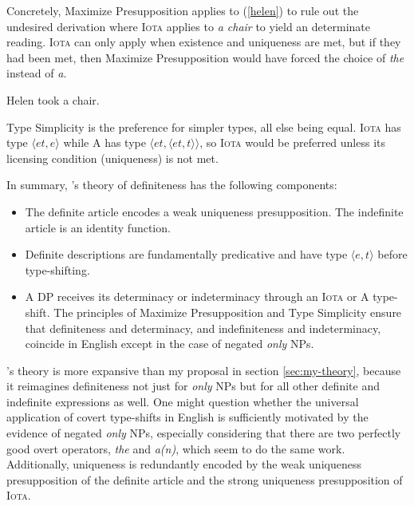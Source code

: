Concretely, Maximize Presupposition applies to (\ref{helen}) to rule out the undesired derivation where \textsc{Iota} applies to \textit{a chair} to yield an determinate reading. \textsc{Iota} can only apply when existence and uniqueness are met, but if they had been met, then Maximize Presupposition would have forced the choice of \textit{the} instead of \textit{a}.

\begin{exe}
	\ex \label{helen} Helen took a chair.
\end{exe}

Type Simplicity is the preference for simpler types, all else being equal. \textsc{Iota} has type $\langle et, e \rangle$ while \textsc{A} has type $\langle et, \langle et, t \rangle \rangle$, so \textsc{Iota} would be preferred unless its licensing condition (uniqueness) is not met.

In summary, \citeauthor{cb2015}'s theory of definiteness has the following components:

\begin{itemize}
	\item The definite article encodes a weak uniqueness presupposition. The indefinite article is an identity function.
	\item Definite descriptions are fundamentally predicative and have type $\langle e, t \rangle$ before type-shifting.
	\item A DP receives its determinacy or indeterminacy through an \textsc{Iota} or \textsc{A} type-shift. The principles of Maximize Presupposition and Type Simplicity ensure that definiteness and determinacy, and indefiniteness and indeterminacy, coincide in English except in the case of negated \textit{only} NPs.
\end{itemize}

\citeauthor{cb2015}'s theory is more expansive than my proposal in section \ref{sec:my-theory}, because it reimagines definiteness not just for \textit{only} NPs but for all other definite and indefinite expressions as well. One might question whether the universal application of covert type-shifts in English is sufficiently motivated by the evidence of negated \textit{only} NPs, especially considering that there are two perfectly good overt operators, \textit{the} and \textit{a(n)}, which seem to do the same work. Additionally, uniqueness is redundantly encoded by the weak uniqueness presupposition of the definite article and the strong uniqueness presupposition of \textsc{Iota}.


